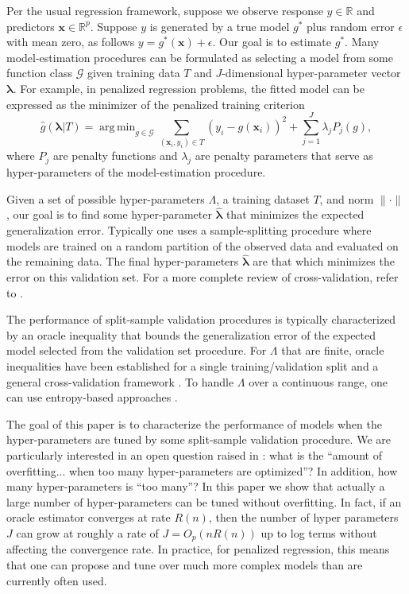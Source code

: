 \documentclass[12pt]{article} %
\theoremstyle{definition}
\DeclareMathOperator*{\argmin}{arg\,min}
\begin{document}
Per the usual regression framework, suppose we observe response $y \in \mathbb{R}$ and predictors $\boldsymbol {x} \in \mathbb{R}^p$. Suppose $y$ is generated by a true model $g^*$ plus random error $\epsilon$ with mean zero, as follows
$y = g^*(\boldsymbol x) + \epsilon$.
Our goal is to estimate $g^*$.
Many model-estimation procedures can be formulated as selecting a model from some function class $\mathcal{G}$ given training data $T$ and $J$-dimensional hyper-parameter vector $\boldsymbol{\lambda}$. For example, in penalized regression problems, the fitted model can be expressed as the minimizer of the penalized training criterion
\begin{equation}
\label{eq:intro_pen_reg}
\hat{g}(\boldsymbol \lambda | T) = \argmin_{g\in \mathcal{G}} \sum_{(\boldsymbol{x}_i, y_i) \in T} \left (y_i -  g(\boldsymbol{x}_i) \right )^2 + \sum_{j=1}^J \lambda_j P_j(g),
\end{equation}
where $P_j$ are penalty functions and $\lambda_j$ are penalty parameters that serve as hyper-parameters of the model-estimation procedure.

Given a set of possible hyper-parameters $\Lambda$, a training dataset $T$, and norm $\|\cdot\|$,
our goal is to find some hyper-parameter $\hat{\boldsymbol{\lambda}}$ that minimizes the expected generalization error.
Typically one uses a sample-splitting procedure where models are trained on a random partition of the observed data and evaluated on the remaining data.
The final hyper-parameters $\hat{\boldsymbol{\lambda}}$ are that which minimizes the error on this validation set.
For a more complete review of cross-validation, refer to \citet{arlot2010survey}.

The performance of split-sample validation procedures is typically characterized by an oracle inequality that bounds the generalization error of the expected model selected from the validation set procedure. For $\Lambda$ that are finite, oracle inequalities have been established for a single training/validation split \citep{gyorfi2006distribution} and a general cross-validation framework \citep{van2003unified, van2004asymptotic}. To handle $\Lambda$ over a continuous range, one can use entropy-based approaches \citep{lecue2012oracle}.

The goal of this paper is to characterize the performance of models when the hyper-parameters are tuned by some split-sample validation procedure. We are particularly interested in an open question raised in \citet{bengio2000gradient}: what is the ``amount of overfitting... when too many hyper-parameters are optimized''? In addition, how many hyper-parameters is ``too many''? In this paper we show that actually a large number of hyper-parameters can be tuned without overfitting. In fact, if an oracle estimator converges at rate $R(n)$, then the number of hyper parameters $J$ can grow at roughly a rate of $J = O_p(nR(n))$ up to log terms without affecting the convergence rate. In practice, for penalized regression, this means that one can propose and tune over much more complex models than are currently often used.
\end{document}
